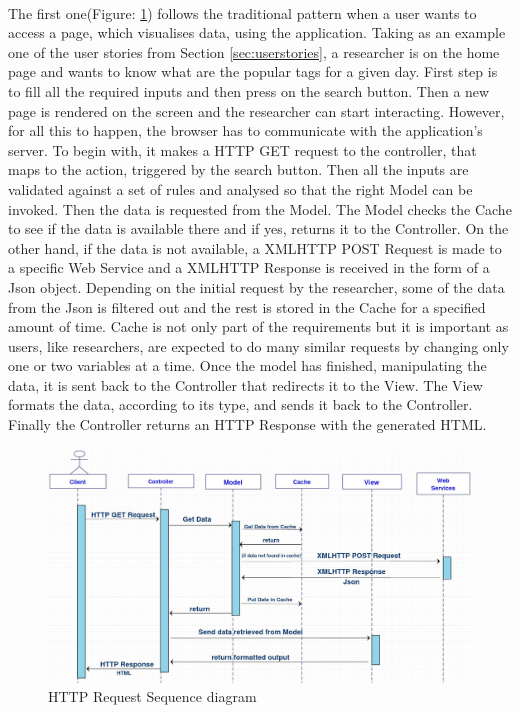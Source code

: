 \documentclass{l4proj}
\begin{document}
\paragraph{}
The first one(Figure: \ref{HTTPRequest}) follows the traditional pattern when a user wants to access a page, which visualises data, using the application. Taking as an example one of the user stories from Section \ref{sec:userstories}, a researcher is on the home page and wants to know what are the popular tags for a given day. First step is to fill all the required inputs and then press on the search button. Then a new page is rendered on the screen and the researcher can start interacting. However, for all this to happen, the browser has to communicate with the application's server. To begin with, it makes a HTTP GET request to the controller, that maps to the action, triggered by the search button. Then all the inputs are validated against a set of rules and analysed so that the right Model can be invoked. Then the data is requested from the Model. The Model checks the Cache to see if the data is available there and if yes, returns it to the Controller. On the other hand, if the data is not available, a XMLHTTP POST Request is made to a specific Web Service and a XMLHTTP Response is received in the form of a Json object. Depending on the initial request by the researcher, some of the data from the Json is filtered out and the rest is stored in the Cache for a specified amount of time. Cache is not only part of the requirements but it is important as users, like researchers, are expected to do many similar requests by changing only one or two variables at a time. Once the model has finished, manipulating the data, it is sent back to the Controller that redirects it to the View. The View formats the data, according to its type, and sends it back to the Controller. Finally the Controller returns an HTTP Response with the generated HTML.  

\begin{figure}[H]
	\centering
	\includegraphics[width=\textwidth]{images/HTTPRequestSequenceDiagram}
	\caption{HTTP Request Sequence diagram}
	\label{HTTPRequest}
\end{figure}
\end{document}
